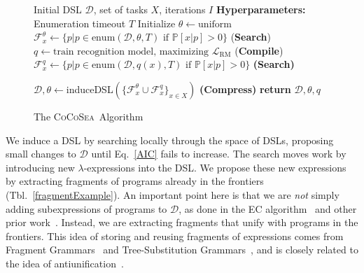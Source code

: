 \documentclass{article}
\newcommand{\system}{\textsc{CoCoSea}~}
\newcommand{\probability}{\mathds{P}} %
\begin{document}
\begin{figure}
  \begin{minipage}{0.6\textwidth}    
    \begin{algorithm}[H]
      \caption{The \system Algorithm}
      \label{mainAlgorithm}
      \begin{algorithmic}
         Initial DSL $\mathcal{D}$, set of tasks $X$, iterations $I$
        \STATE \textbf{Hyperparameters:} Enumeration timeout $T$
        \STATE Initialize $\theta\gets \text{uniform}$ %
        \STATE  $\mathcal{F}^{\theta}_x\gets \{p| p\in \text{enum}(\mathcal{D},\theta,T)\text{ if }\probability[x|p] > 0\}$ \footnotesize{(\textbf{Search})}
        \STATE $q\gets \text{train recognition model, maximizing }\mathcal{L}_{\text{RM}}$ \hspace{0.2cm}(\footnotesize{\textbf{Compile}})
        \STATE  $\mathcal{F}^{q}_x\gets\{p|p\in \text{enum}(\mathcal{D},q(x),T)\text{ if }\probability[x|p] > 0\}$ \footnotesize{\textbf{(Search)}}
        
        \STATE $\mathcal{D},\theta\gets $induceDSL$(\{\mathcal{F}^{\theta}_x\cup\mathcal{F}^{q}_x\}_{x\in X})$  \hspace{1.1cm} \footnotesize{\textbf{(Compress)}}
        \ENDFOR
        \STATE \textbf{return} $\mathcal{D},\theta,q$
      \end{algorithmic}
    \end{algorithm}
  \end{minipage}
\end{figure}%

We induce a DSL by searching locally through the space of DSLs,
proposing small changes to $\mathcal{D}$ until Eq.~\ref{AIC} fails to increase.
The search moves work by introducing new
$\lambda$-expressions into the DSL.
We propose these new expressions by extracting fragments of
programs already in the frontiers (Tbl.~\ref{fragmentExample}).
An important point here is that we are \emph{not} simply adding
subexpressions of programs to $\mathcal{D}$, as done in the EC algorithm~\cite{Dechter:2013:BLV:2540128.2540316} and other prior work~\cite{DBLP:conf/ecai/LinDETM14}.  Instead, we are
extracting fragments that unify with programs in the frontiers.  This
idea of storing and reusing fragments of expressions comes from
Fragment Grammars~\cite{tim} and Tree-Substitution
Grammars~\cite{cohn2010inducing}, and is closely related to the idea
of antiunification~\cite{henderson2013cumulative}.
\end{document}
